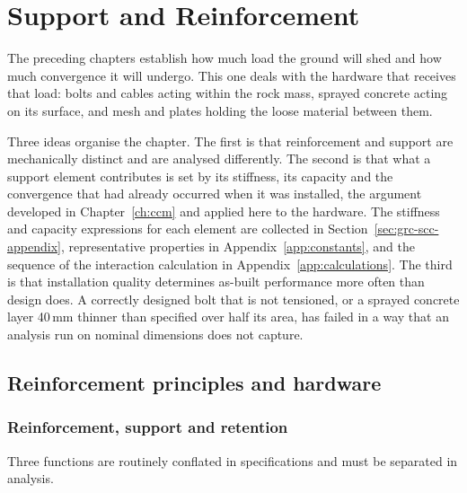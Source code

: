 \chapter{Support and Reinforcement}
\label{ch:support}

The preceding chapters establish how much load the ground will shed and how
much convergence it will undergo. This one deals with the hardware that
receives that load: bolts and cables acting within the rock mass, sprayed
concrete acting on its surface, and mesh and plates holding the loose material
between them.

Three ideas organise the chapter. The first is that reinforcement and support
are mechanically distinct and are analysed differently. The second is that
what a support element contributes is set by its stiffness, its capacity and
the convergence that had already occurred when it was installed, the
argument developed in Chapter~\ref{ch:ccm} and applied here to the hardware.
The stiffness and capacity expressions for each element are collected in
Section~\ref{sec:grc-scc-appendix}, representative properties in
Appendix~\ref{app:constants}, and the sequence of the interaction
calculation in Appendix~\ref{app:calculations}.
The third is that installation quality determines as-built performance more
often than design does. A correctly designed bolt that is not tensioned, or a
sprayed concrete layer 40\,mm thinner than specified over half its area, has failed
in a way that an analysis run on nominal dimensions does not capture.

\section{Reinforcement principles and hardware}
\label{sec:reinforcement-principles}

\subsection{Reinforcement, support and retention}
\label{sec:reinforcement-vs-support}

Three functions are routinely conflated in specifications and must be
separated in analysis.

